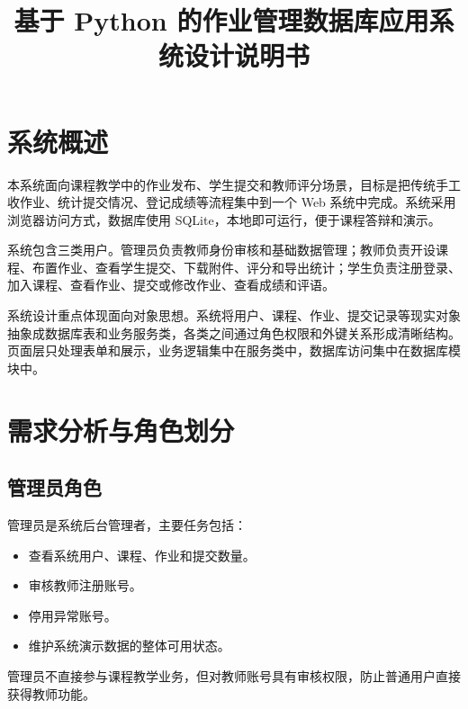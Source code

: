 \documentclass[UTF8,12pt]{ctexart}
\title{\textbf{基于 Python 的作业管理数据库应用系统设计说明书}}
\author{}
\date{}
\begin{document}
\maketitle


\section{系统概述}

本系统面向课程教学中的作业发布、学生提交和教师评分场景，目标是把传统手工收作业、统计提交情况、登记成绩等流程集中到一个 Web 系统中完成。系统采用浏览器访问方式，数据库使用 SQLite，本地即可运行，便于课程答辩和演示。

系统包含三类用户。管理员负责教师身份审核和基础数据管理；教师负责开设课程、布置作业、查看学生提交、下载附件、评分和导出统计；学生负责注册登录、加入课程、查看作业、提交或修改作业、查看成绩和评语。

系统设计重点体现面向对象思想。系统将用户、课程、作业、提交记录等现实对象抽象成数据库表和业务服务类，各类之间通过角色权限和外键关系形成清晰结构。页面层只处理表单和展示，业务逻辑集中在服务类中，数据库访问集中在数据库模块中。


\newpage

\section{需求分析与角色划分}

\subsection{管理员角色}

管理员是系统后台管理者，主要任务包括：

\begin{itemize}
  \item 查看系统用户、课程、作业和提交数量。
  \item 审核教师注册账号。
  \item 停用异常账号。
  \item 维护系统演示数据的整体可用状态。
\end{itemize}

管理员不直接参与课程教学业务，但对教师账号具有审核权限，防止普通用户直接获得教师功能。
\end{document}
